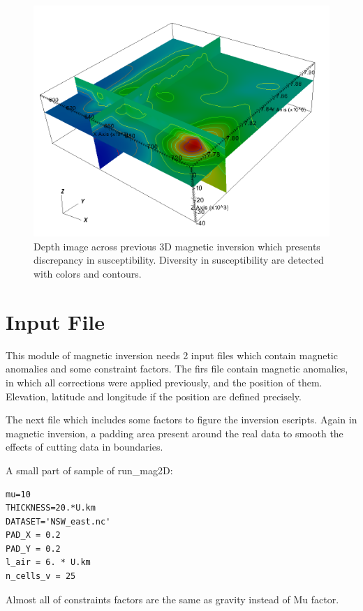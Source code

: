 \begin{figure}
\centering
\includegraphics[width=\textwidth]{sus3D.png}
\caption{Depth image across previous 3D magnetic inversion which presents discrepancy in susceptibility. Diversity in susceptibility are detected with colors and contours.}
\end{figure}

\section{Input File} 

This module of magnetic inversion needs 2 input files which contain magnetic anomalies and some constraint factors. The firs file contain magnetic anomalies, in which all corrections were applied previously, and the position of them. Elevation, latitude and longitude if the position are defined precisely.

The next file which includes some factors to figure the inversion escripts. 
Again in magnetic inversion, a padding area present around the real data to smooth the effects of cutting data in boundaries.
 
A small part of sample of run_mag2D:

\begin{verbatim}
mu=10
THICKNESS=20.*U.km
DATASET='NSW_east.nc'
PAD_X = 0.2
PAD_Y = 0.2
l_air = 6. * U.km
n_cells_v = 25
\end{verbatim}

Almost all of constraints factors are the same as gravity instead of Mu factor.\\


